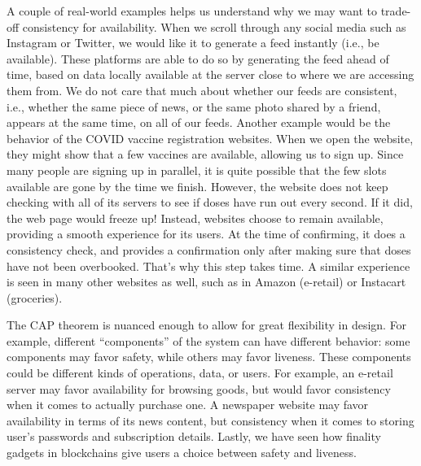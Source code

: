 \documentclass{article}
\begin{document}
A couple of real-world examples helps us understand why we may want to trade-off consistency for availability. When we scroll through any social media such as Instagram or Twitter, we would like it to generate a feed instantly (i.e., be available). These platforms are able to do so by generating the feed ahead of time, based on data locally available at the server close to where we are accessing them from. We do not care that much about whether our feeds are consistent, i.e., whether the same piece of news, or the same photo shared by a friend, appears at the same time, on all of our feeds. Another example would be the behavior of the COVID vaccine registration websites. When we open the website, they might show that a few vaccines are available, allowing us to sign up. Since many people are signing up in parallel, it is quite possible that the few slots available are gone by the time we finish. However, the website does not keep checking with all of its servers to see if doses have run out every second. If it did, the web page would freeze up! Instead, websites choose to remain available, providing a smooth experience for its users. At the time of confirming, it does a consistency check, and provides a confirmation only after making sure that doses have not been overbooked. That's why this step takes time. A similar experience is seen in many other websites as well, such as in Amazon (e-retail) or Instacart (groceries).

The CAP theorem is nuanced enough to allow for great flexibility in design. For example, different ``components'' of the system can have different behavior: some components may favor safety, while others may favor liveness. These components could be different kinds of operations, data, or users. For example, an e-retail server may favor availability for browsing goods, but would favor consistency when it comes to actually purchase one. A newspaper website may favor availability in terms of its news content, but consistency when it comes to storing user's passwords and subscription details. Lastly, we have seen how finality gadgets in blockchains give users a choice between safety and liveness.
\end{document}
